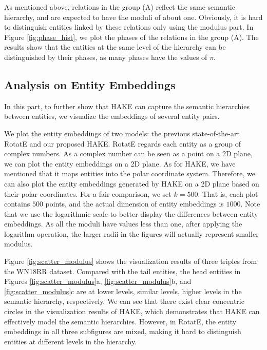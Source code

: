 \documentclass[letterpaper]{article} \usepackage{aaai20}  \usepackage{times}  \usepackage{helvet} \usepackage{courier}  \usepackage[hyphens]{url}  \usepackage{graphicx} \urlstyle{rm} \def\UrlFont{\rm}  \usepackage{graphicx}  \frenchspacing  \setlength{\pdfpagewidth}{8.5in}  \setlength{\pdfpageheight}{11in}
\newcommand{\citep}{\cite}
\begin{document}
As mentioned above, relations in the group (A) reflect the same semantic hierarchy, and are expected to have the moduli of about one. Obviously, it is hard to distinguish entities linked by these relations only using the modulus part. In Figure \ref{fig:phase_hist}, we plot the phases of the relations in the group (A). The results show that the entities at the same level of the hierarchy can be distinguished by their phases, as many phases have the values of $\pi$.

\begin{table}[ht]
    \centering
    \caption{Comparison results with TKRL models \citep{hType} on FB15k dataset. RHE, WHE, RHE+STC, and WHE+STC are four versions of TKRL model , of which the results are taken from the original paper.}
    \label{table:cmp_tkrl}
\end{table}

\subsection{Analysis on Entity Embeddings}
In this part, to further show that HAKE can capture the semantic hierarchies between entities, we visualize the embeddings of several entity pairs.

We plot the entity embeddings of two models: the previous state-of-the-art RotatE and our proposed HAKE. RotatE regards each entity as a group of complex numbers. As a complex number can be seen as a point on a 2D plane, we can plot the entity embeddings on a 2D plane. As for HAKE, we have mentioned that it maps entities into the polar coordinate system. Therefore, we can also plot the entity embeddings generated by HAKE on a 2D plane based on their polar coordinates. For a fair comparison, we set $k=500$. That is, each plot contains $500$ points, and the actual dimension of entity embeddings is $1000$.  Note that we use the logarithmic scale to better display the differences between entity embeddings. As all the moduli have values less than one, after applying the logarithm operation, the larger radii in the figures will actually represent smaller modulus.

Figure \ref{fig:scatter_modulus} shows the visualization results of three triples from the WN18RR dataset. Compared with the tail entities, the head entities in Figures \ref{fig:scatter_modulus}a, \ref{fig:scatter_modulus}b, and \ref{fig:scatter_modulus}c are at lower levels, similar levels, higher levels in the semantic hierarchy, respectively. We can see that there exist clear concentric circles in the visualization results of HAKE, which demonstrates that HAKE can effectively model the semantic hierarchies. However, in RotatE, the entity embeddings in all three subfigures are mixed, making it hard to distinguish entities at different levels in the hierarchy.
\end{document}
